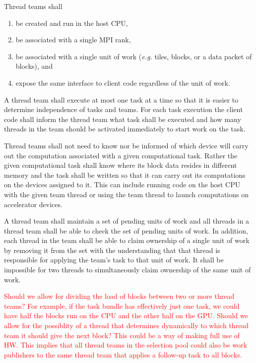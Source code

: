 \documentclass{article}
\begin{document}
\begin{req}
Thread teams shall
\begin{enumerate}
\item{be created and run in the host CPU,}
\item{be associated with a single MPI rank,}
\item{be associated with a single unit of work (\textit{e.g.} tiles, blocks, or a
data packet of blocks), and}
\item{expose the same interface to client code regardless of the unit of work.}
\end{enumerate}
\end{req}

\begin{req}
A thread team shall execute at most one task at a time so that it is easier to
determine independence of tasks and teams.  For each task execution the client
code shall inform the thread team what task shall be executed and how many
threads in the team should be activated immediately to start work on the task.
\end{req}

\begin{req}
Thread teams shall not need to know nor be informed of which device will carry
out the computation associated with a given computational task.  Rather the
given computational task shall know where its block data resides in different
memory and the task shall be written so that it can carry out its computations
on the devices assigned to it.  This can include running code on the host CPU
with the given team thread or using the team thread to launch computations on
accelerator devices.
\end{req}

\begin{req}
A thread team shall maintain a set of pending units of work and all threads in a
thread team shall be able to check the set of pending units of work.  In
addition, each thread in the team shall be able to claim ownership of a single
unit of work by removing it from the set with the understanding that that thread
is responsible for applying the team's task to that unit of work.  It shall be
impossible for two threads to simultaneously claim ownership of the same unit of
work.
\end{req}

\textcolor{red}{Should we allow for dividing the
load of blocks between two or more thread teams?  For example, if the task
bundle has effectively just one task, we could have half the blocks run on the
CPU and the other half on the GPU.  Should we allow for the possiblity of a
thread that determines dynamically to which thread team it should give the next
block?  This could be a way of making full use of HW.  This implies that all
thread teams in the selection pool could also be work publishers to the same
thread team that applies a follow-up task to all blocks.}
\end{document}
